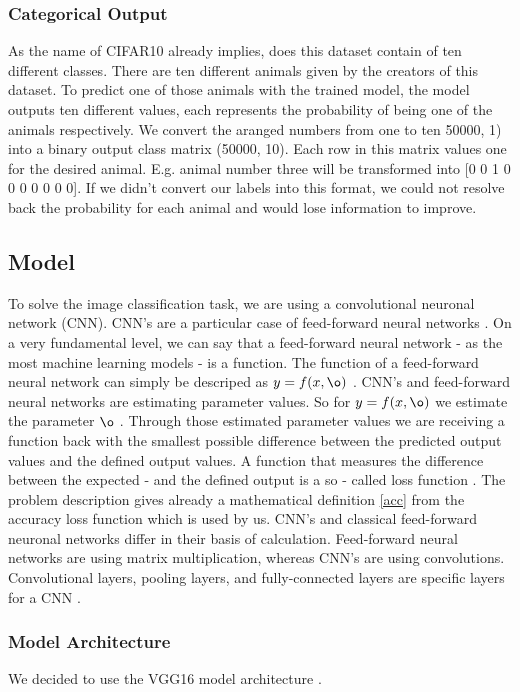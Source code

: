 \documentclass[journal]{IEEEtran}
\begin{document}
\subsubsection{Categorical Output}
\noindent As the name of CIFAR10 already implies, does this dataset contain of ten different classes. There are ten different animals given by the creators of this dataset. To predict one of those animals with the trained model, the model outputs ten different values, each represents the probability of being one of the animals respectively. 
We convert the aranged numbers from one to ten 50000, 1) into a binary output class matrix (50000, 10). Each row in this matrix values one for the desired animal. E.g. animal number three will be transformed into [0 0 1 0 0 0 0 0 0 0].
If we didn't convert our labels into this format, we could not resolve back the probability for each animal and would lose information to improve. \\

\subsection{Model}
\noindent To solve the image classification task, we are using a convolutional neuronal network (CNN). CNN's are a particular case of feed-forward neural networks \cite{Goodfellow-et-al-2016}. On a very fundamental level, we can say that a feed-forward neural network - as the most machine learning models - is a function. The function of a feed-forward neural network can simply be descriped as \(y = f(x, \o )\) . CNN's and feed-forward neural networks are estimating parameter values. So for \(y = f(x, \o )\) we estimate the parameter \(\o \) \cite{Goodfellow-et-al-2016}. Through those estimated parameter values we are receiving a function back with the smallest possible difference between the predicted output values and the defined output values. A function that measures the difference between the expected - and the defined output is a so - called loss function \cite{Goodfellow-et-al-2016}. The problem description gives already a mathematical definition \eqref{acc} from the accuracy loss function which is used by us. 
CNN's and classical feed-forward neuronal networks differ in their basis of calculation. Feed-forward neural networks are using matrix multiplication, whereas CNN's are using convolutions. Convolutional layers, pooling layers, and fully-connected layers are specific layers for a CNN \cite{LeCun1998}. \\
\subsubsection{Model Architecture}
We decided to use the VGG16 model architecture \cite{RN15}. 
\end{document}
